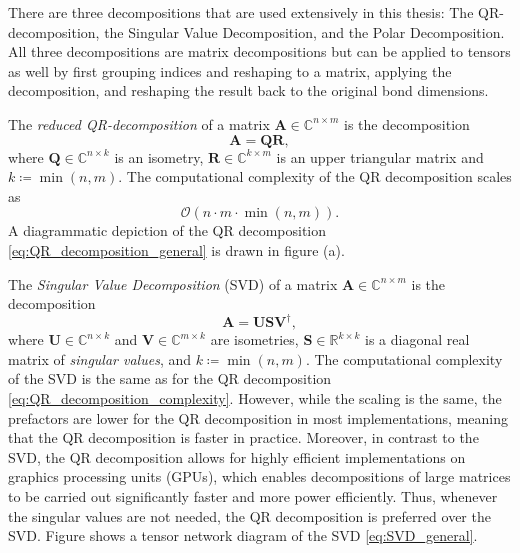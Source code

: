 There are three decompositions that are used extensively in this thesis: The QR-decomposition, the Singular Value Decomposition, and the Polar Decomposition. All three decompositions are matrix decompositions but can be applied to tensors as well by first grouping indices and reshaping to a matrix, applying the decomposition, and reshaping the result back to the original bond dimensions. \par
The \textit{reduced QR-decomposition} of a matrix $\bm{A} \in \mathbb{C}^{n\times m}$ is the decomposition
\begin{equation}
	\label{eq:QR_decomposition_general}
	\bm{A} = \bm{Q}\bm{R},
\end{equation}
where $\bm{Q}\in\mathbb{C}^{n\times k}$ is an isometry, $\bm{R}\in\mathbb{C}^{k\times m}$ is an upper triangular matrix and $k \coloneqq \min(n, m)$. The computational complexity of the QR decomposition scales as
\begin{equation}
	\label{eq:QR_decomposition_complexity}
	\mathcal{O}\left(n\cdot m\cdot\min(n, m)\right).
\end{equation}
A diagrammatic depiction of the QR decomposition \eqref{eq:QR_decomposition_general} is drawn in figure (a). \par
The \textit{Singular Value Decomposition} (SVD) of a matrix $\bm{A} \in \mathbb{C}^{n\times m}$ is the decomposition
\begin{equation}
	\label{eq:SVD_general}
	\bm{A} = \bm{U}\bm{S}\bm{V}^\dagger,
\end{equation}
where $\bm{U}\in\mathbb{C}^{n\times k}$ and $\bm{V}\in\mathbb{C}^{m\times k}$ are isometries, $\bm{S}\in\mathbb{R}^{k\times k}$ is a diagonal real matrix of \textit{singular values}, and $k \coloneqq \min(n, m)$. The computational complexity of the SVD is the same as for the QR decomposition \eqref{eq:QR_decomposition_complexity}. However, while the scaling is the same, the prefactors are lower for the QR decomposition in most implementations, meaning that the QR decomposition is faster in practice. Moreover, in contrast to the SVD, the QR decomposition allows for highly efficient implementations on graphics processing units (GPUs), which enables decompositions of large matrices to be carried out significantly faster and more power efficiently. Thus, whenever the singular values are not needed, the QR decomposition is preferred over the SVD. Figure  shows a tensor network diagram of the SVD \eqref{eq:SVD_general}. \par
